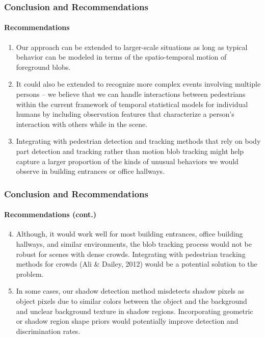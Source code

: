 
\begin{frame}
    \frametitle{Conclusion and Recommendations}
    \framesubtitle{Recommendations}

    \begin{enumerate}
        \item Our approach can be extended to larger-scale situations 
            as long as typical behavior can be modeled in terms of the 
            spatio-temporal motion of foreground blobs. 
        \item It could also be extended to recognize more complex events involving 
            multiple persons -- we believe that we can handle interactions between 
            pedestrians within the current framework of temporal statistical 
            models for individual humans by including 
            observation features that characterize a person's interaction with others 
            while in the scene. 
        \item Integrating with pedestrian detection and tracking 
            methods that rely on body part detection and tracking rather 
            than motion blob tracking might help 
            capture a larger proportion of the kinds of unusual 
            behaviors we would observe in building entrances or office hallways.
    \end{enumerate}

\end{frame}


\begin{frame}
    \frametitle{Conclusion and Recommendations}
    \framesubtitle{Recommendations (cont.)}

    \begin{enumerate}
        \setcounter{enumi}{3}
        \item Although, it would work well for most building entrances, 
            office building 
            hallways, and similar environments, the blob tracking 
            process would not be
            robust for scenes with dense crowds. Integrating with 
            pedestrian tracking 
            methods for crowds (Ali \& Dailey, 2012) would be a 
            potential solution 
            to the problem.
        \item In some cases, our shadow detection method misdetects 
            shadow pixels 
            as object pixels due to similar
            colors between the object and the background and unclear 
            background 
            texture in shadow regions. Incorporating geometric or shadow 
            region 
            shape priors would potentially improve detection and 
            discrimination rates. 
    \end{enumerate}

\end{frame}

